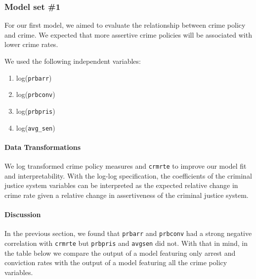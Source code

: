 \documentclass[]{article}
\let\oldparagraph\paragraph
\renewcommand{\paragraph}[1]{\oldparagraph{#1}\mbox{}}
\begin{document}
\hypertarget{model-set-1}{%
\subsubsection{Model set \#1}\label{model-set-1}}

For our first model, we aimed to evaluate the relationship between crime
policy and crime. We expected that more assertive crime policies will be
associated with lower crime rates.

We used the following independent variables:

\begin{enumerate}
\def\labelenumi{(\arabic{enumi})}
\item
  log(\texttt{prbarr})
\item
  log(\texttt{prbconv})
\item
  log(\texttt{prbpris})
\item
  log(\texttt{avg\_sen})
\end{enumerate}

\hypertarget{data-transformations}{%
\paragraph{Data Transformations}\label{data-transformations}}

We log transformed crime policy measures and \texttt{crmrte} to improve
our model fit and interpretability. With the log-log specification, the
coefficients of the criminal justice system variables can be interpreted
as the expected relative change in crime rate given a relative change in
assertiveness of the criminal justice system.

\hypertarget{discussion}{%
\paragraph{Discussion}\label{discussion}}

In the previous section, we found that \texttt{prbarr} and
\texttt{prbconv} had a strong negative correlation with \texttt{crmrte}
but \texttt{prbpris} and \texttt{avgsen} did not. With that in mind, in
the table below we compare the output of a model featuring only arrest
and conviction rates with the output of a model featuring all the crime
policy variables.
\end{document}
